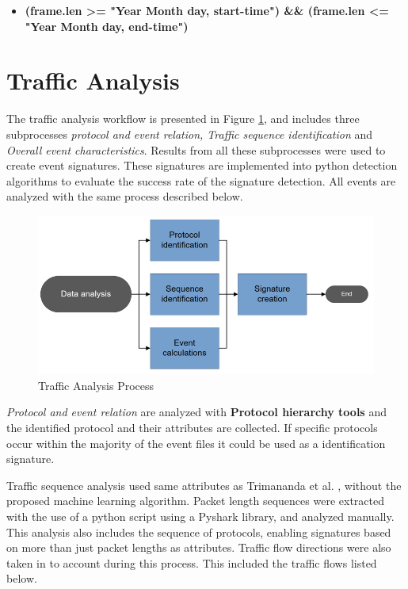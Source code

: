 \begin{itemize}
    \item \textbf{(frame.len >= "Year Month day, start-time") \&\& (frame.len <= "Year Month day, end-time")}
\end{itemize}



\section{Traffic Analysis}

The traffic analysis workflow is presented in Figure \ref{fig:TrafficAnalysisProcess}, and includes three subprocesses \textit{protocol and event relation, Traffic sequence identification} and \textit{Overall event characteristics}. Results from all these subprocesses were used to create event signatures. These signatures are implemented into python detection algorithms to evaluate the success rate of the signature detection. All events are analyzed with the same process described below.  

\begin{figure}[H]
    \centering
    \includegraphics[width=\textwidth]{figures/TrafficAnalysisProcess.png}
    \caption{Traffic Analysis Process}
    \label{fig:TrafficAnalysisProcess}
\end{figure}

\textit{Protocol and event relation} are analyzed with \textbf{Protocol hierarchy tools} and the identified protocol and their attributes are collected. If specific protocols occur within the majority of the event files it could be used as a identification signature.

Traffic sequence analysis used same attributes as Trimananda et al.  \cite{pingpong_trimananda2020packet}, without the proposed machine learning algorithm. Packet length sequences were extracted with the use of a python script using a Pyshark library, and analyzed manually. This analysis also includes the sequence of protocols, enabling signatures based on more than just packet lengths as attributes. Traffic flow directions were also taken in to account during this process. This included the traffic flows listed below. 

